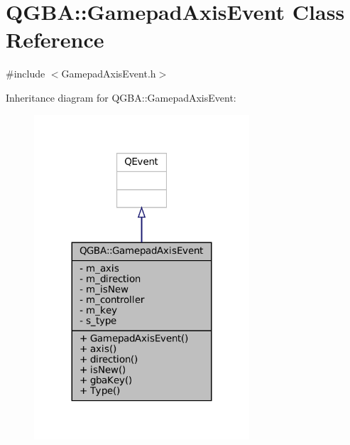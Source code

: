 \hypertarget{class_q_g_b_a_1_1_gamepad_axis_event}{}\section{Q\+G\+BA\+:\+:Gamepad\+Axis\+Event Class Reference}
\label{class_q_g_b_a_1_1_gamepad_axis_event}


{\ttfamily \#include $<$Gamepad\+Axis\+Event.\+h$>$}



Inheritance diagram for Q\+G\+BA\+:\+:Gamepad\+Axis\+Event\+:
\nopagebreak
\begin{figure}[H]
\begin{center}
\leavevmode
\includegraphics[width=227pt]{class_q_g_b_a_1_1_gamepad_axis_event__inherit__graph}
\end{center}
\end{figure}


